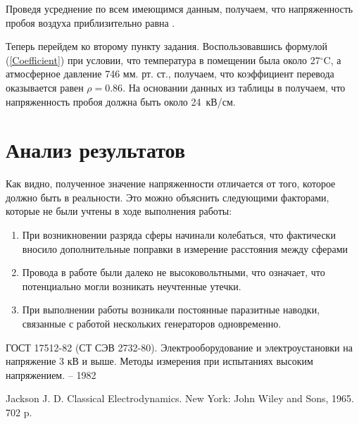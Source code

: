 \documentclass[a4paper, 12pt]{article}
\renewcommand{\refname}{Список литературы}%
\begin{document}
Проведя усреднение по всем имеющимся данным, получаем, что напряженность пробоя воздуха приблизительно равна .

\bigskip

Теперь перейдем ко второму пункту задания. Воспользовавшись формулой (\ref{Coefficient}) при условии, что температура в помещении была около 27$^\circ$C, а атмосферное давление 746 мм. рт. ст., получаем, что коэффициент перевода оказывается равен $\rho = 0.86$. На основании данных из таблицы в \cite{GOST} получаем, что напряженность пробоя должна быть около 24~кВ/см.

\section{Анализ результатов}

Как видно, полученное значение напряженности отличается от того, которое должно быть в реальности. Это можно объяснить следующими факторами, которые не были учтены в ходе выполнения работы:

\begin{enumerate}
	\item При возникновении разряда сферы начинали колебаться, что фактически вносило дополнительные поправки в измерение расстояния между сферами
	
	\item Провода в работе были далеко не высоковольтными, что означает, что потенциально могли возникать неучтенные утечки.
	
	\item При выполнении работы возникали постоянные паразитные наводки, связанные с работой нескольких генераторов одновременно.
	
\end{enumerate}




\newpage


\begin{thebibliography}{9}
	\addcontentsline{toc}{section}{\refname}
	 ГОСТ 17512-82 (СТ СЭВ 2732-80). Электрооборудование и электроустановки на напряжение 3 кВ и выше. Методы измерения при испытаниях высоким напряжением. -- 1982
	
	 Jackson J. D. Classical Electrodynamics. New York: John Wiley and Sons, 1965. 702 p.
\end{thebibliography}
\end{document}
